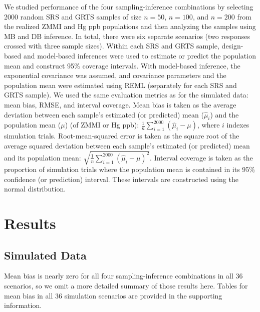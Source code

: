 \documentclass[]{elsarticle} %
\begin{document}
We studied performance of the four sampling-inference combinations by
selecting 2000 random SRS and GRTS samples of size \(n = 50\),
\(n = 100\), and \(n = 200\) from the realized ZMMI and Hg ppb
populations and then analyzing the samples using MB and DB inference. In
total, there were six separate scenarios (two responses crossed with
three sample sizes). Within each SRS and GRTS sample, design-based and
model-based inferences were used to estimate or predict the population
mean and construct 95\% coverage intervals. With model-based inference,
the exponential covariance was assumed, and covariance parameters and
the population mean were estimated using REML (separately for each SRS
and GRTS sample). We used the same evaluation metrics as for the
simulated data: mean bias, RMSE, and interval coverage. Mean bias is
taken as the average deviation between each sample's estimated (or
predicted) mean (\(\hat{\mu}_i\)) and the population mean (\(\mu\)) (of
ZMMI or Hg ppb): \(\frac{1}{n}\sum_{i = 1}^{2000} (\hat{\mu}_i - \mu)\),
where \(i\) indexes simulation trials. Root-mean-squared error is taken
as the square root of the average squared deviation between each
sample's estimated (or predicted) mean and its population mean:
\(\sqrt{\frac{1}{n}\sum_{i = 1}^{2000} (\hat{\mu}_i - \mu)^2}\).
Interval coverage is taken as the proportion of simulation trials where
the population mean is contained in its 95\% confidence (or prediction)
interval. These intervals are constructed using the normal distribution.

\hypertarget{sec:results}{%
\section{Results}\label{sec:results}}

\hypertarget{sec:r_sim}{%
\subsection{Simulated Data}\label{sec:r_sim}}

Mean bias is nearly zero for all four sampling-inference combinations in
all 36 scenarios, so we omit a more detailed summary of those results
here. Tables for mean bias in all 36 simulation scenarios are provided
in the supporting information.
\end{document}
